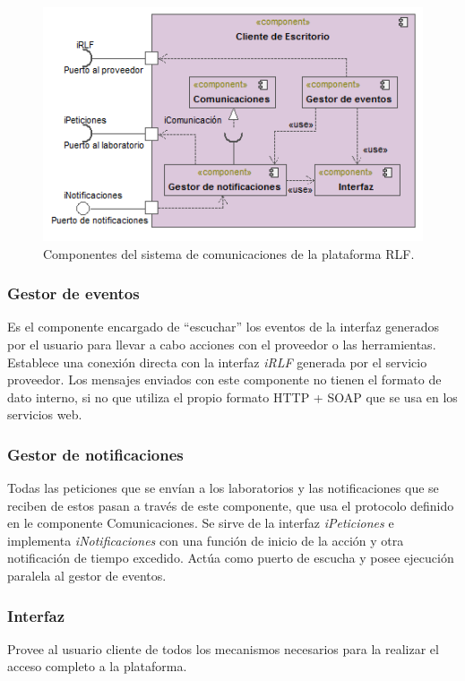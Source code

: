 \begin{figure}[h]
	\centering
	\includegraphics[scale=0.65]{images/Cliente.png}
	\caption[Comunicaciones RLF]{Componentes del sistema de 
	comunicaciones de la plataforma RLF.}
	\label{fig:cliente}
\end{figure}

\subsubsection{Gestor de eventos}
Es el componente encargado de ``escuchar'' los eventos de la interfaz 
generados por el usuario para llevar a cabo acciones con el proveedor 
o las herramientas. Establece una conexión directa con la interfaz 
\emph{iRLF} generada por el servicio proveedor. Los mensajes enviados 
con este componente no tienen el formato de dato interno, si no que 
utiliza el propio formato HTTP + SOAP que se usa en los servicios web.

\subsubsection{Gestor de notificaciones}
Todas las peticiones que se envían a los laboratorios y las 
notificaciones que se reciben de estos pasan a través de este 
componente, que usa el protocolo definido en le componente 
Comunicaciones. Se sirve de la interfaz \emph{iPeticiones} e 
implementa \emph{iNotificaciones} con una función de inicio de la 
acción y otra notificación de tiempo excedido. Actúa como puerto de 
escucha y posee ejecución paralela al gestor de eventos.

\subsubsection{Interfaz}
Provee al usuario cliente de todos los mecanismos necesarios para la 
realizar el acceso completo a la plataforma.

